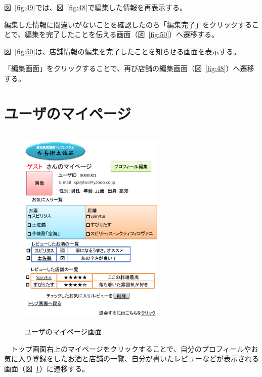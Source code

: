 \documentclass[a4j,titlepage]{jarticle}
\begin{document}
図~\ref{fig:49}では、図~\ref{fig:48}で編集した情報を再表示する。



編集した情報に間違いがないことを確認したのち「編集完了」をクリックすることで、編集を完了したことを伝える画面（図~\ref{fig:50}）へ遷移する。







図~\ref{fig:50}は、店舗情報の編集を完了したことを知らせる画面を表示する。



「編集画面」をクリックすることで、再び店舗の編集画面（図~\ref{fig:48}）へ遷移する。

\clearpage

\section{ユーザのマイページ}



\begin {figure}[!htbp]
    \begin{center}
    \includegraphics [height=10cm, width=7cm]{51.eps}
    \caption {ユーザのマイページ画面}
    \label {fig:51}
    \end{center}
\end {figure}




　トップ画面右上のマイページをクリックすることで、自分のプロフィールやお気に入り登録をしたお酒と店舗の一覧、自分が書いたレビューなどが表示される画面（図~\ref{fig:51}）に遷移する。
\end{document}
